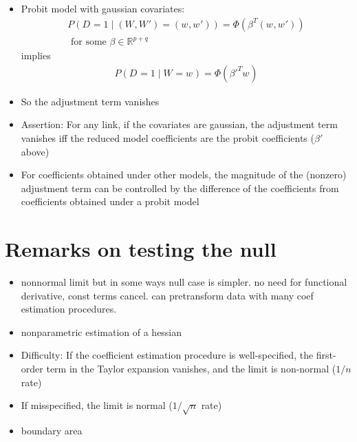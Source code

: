 \documentclass{beamer}
\renewcommand{\P}{P}
\newcommand{\W}[1][]{W_{#1}}
\newcommand{\w}[1][]{w_{#1}}
\newcommand{\D}[1][]{D_{#1}}
\renewcommand{\t}[1]{{#1}^T}
\begin{document}
\begin{frame}
  \begin{itemize}
  \item Probit model with gaussian covariates:
    \begin{align}
      \P(\D=1\mid(\W,\W')=(\w,\w')) = \Phi(\t\beta (\w,\w'))\\ \text{ for some }\beta\in\mathbb{R}^{p+q}
    \end{align}
    implies
    \begin{align}
      \P(\D=1\mid \W=\w) = \Phi(\t{\beta'} \w)
    \end{align}
  \item So the adjustment term vanishes
  \item Assertion: For any link, if the covariates are gaussian, the adjustment term vanishes iff the reduced model coefficients are the probit coefficients ($\beta'$ above)
  \item For coefficients obtained under other models, the magnitude of the (nonzero) adjustment term can be controlled by the difference of the coefficients from coefficients obtained under a probit model
  \end{itemize}

\end{frame}

\section{Remarks on testing the null}

\begin{frame}
  \begin{itemize}
\item nonnormal limit but in some ways null case is simpler. no need for
functional derivative, const terms cancel. can pretransform data with many coef estimation
procedures.

\item nonparametric estimation of a hessian
\end{itemize}
\end{frame}

\begin{frame}

  \begin{itemize}
\item  Difficulty: If the coefficient estimation procedure is
  well-specified, the first-order term in the Taylor expansion
  vanishes, and the limit is non-normal ($1/n$ rate)
\item  If misspecified, the limit is normal ($1/\sqrt{n}$ rate)

\item boundary area
\end{itemize}
\end{frame}
\end{document}

